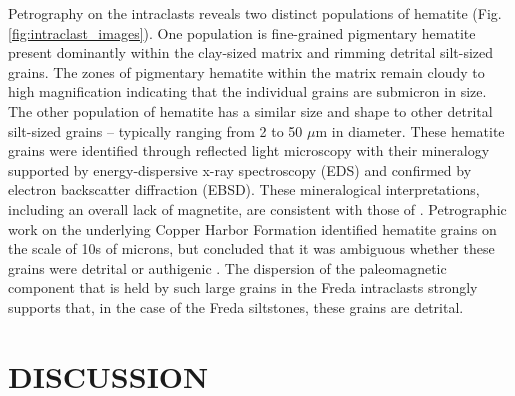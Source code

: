 \documentclass[11pt,letterpaper]{article}
\begin{document}
Petrography on the intraclasts reveals two distinct populations of hematite (Fig. \ref{fig:intraclast_images}). One population is fine-grained pigmentary hematite present dominantly within the clay-sized matrix and rimming detrital silt-sized grains. The zones of pigmentary hematite within the matrix remain cloudy to high magnification indicating that the individual grains are submicron in size. The other population of hematite has a similar size and shape to other detrital silt-sized grains  -- typically ranging from 2 to 50 $\mu$m in diameter. These hematite grains were identified through reflected light microscopy with their mineralogy supported by energy-dispersive x-ray spectroscopy (EDS) and confirmed by electron backscatter diffraction (EBSD). These mineralogical interpretations, including an overall lack of magnetite, are consistent with those of \cite{Vincenz1968b}. Petrographic work on the underlying Copper Harbor Formation identified hematite grains on the scale of 10s of microns, but concluded that it was ambiguous whether these grains were detrital or authigenic \citep{Elmore1982a}. The dispersion of the paleomagnetic component that is held by such large grains in the Freda intraclasts strongly supports that, in the case of the Freda siltstones, these grains are detrital.



\section*{DISCUSSION}
\end{document}
